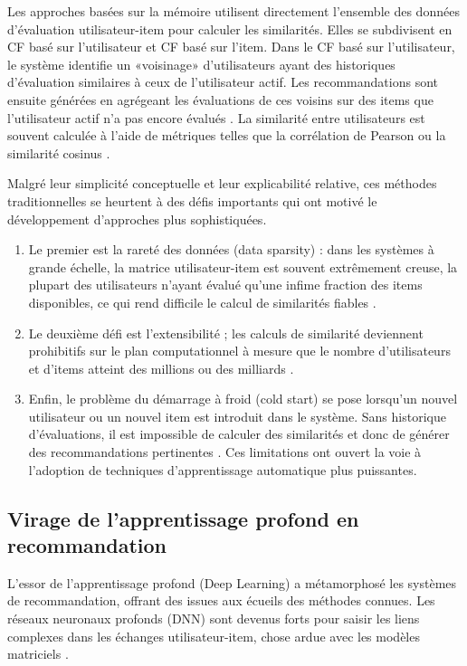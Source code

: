 Les approches basées sur la mémoire utilisent directement l'ensemble des données d'évaluation utilisateur-item pour calculer les similarités. Elles se subdivisent en CF basé sur l'utilisateur et CF basé sur l'item. Dans le CF basé sur l'utilisateur, le système identifie un «voisinage» d'utilisateurs ayant des historiques d'évaluation similaires à ceux de l'utilisateur actif. Les recommandations sont ensuite générées en agrégeant les évaluations de ces voisins sur des items que l'utilisateur actif n'a pas encore évalués \citet{Herlocker2004}. La similarité entre utilisateurs est souvent calculée à l'aide de métriques telles que la corrélation de Pearson ou la similarité cosinus \citet{Breese2002Empirical}.

Malgré leur simplicité conceptuelle et leur explicabilité relative, ces méthodes traditionnelles se heurtent à des défis importants qui ont motivé le développement d'approches plus sophistiquées. 
\begin{enumerate}
    \item Le premier est la rareté des données (data sparsity) : dans les systèmes à grande échelle, la matrice utilisateur-item est souvent extrêmement creuse, la plupart des utilisateurs n'ayant évalué qu'une infime fraction des items disponibles, ce qui rend difficile le calcul de similarités fiables \citep{Sarwar2001, Isinkaye2015Recommendation}.
    \item Le deuxième défi est l'extensibilité ; les calculs de similarité deviennent prohibitifs sur le plan computationnel à mesure que le nombre d'utilisateurs et d'items atteint des millions ou des milliards \citep{Linden2003Amazoncom}.
    \vspace{1em}
    \item Enfin, le problème du démarrage à froid (cold start) se pose lorsqu'un nouvel utilisateur ou un nouvel item est introduit dans le système. Sans historique d'évaluations, il est impossible de calculer des similarités et donc de générer des recommandations pertinentes \citep{Schein2002, Lika2014Facing}. Ces limitations ont ouvert la voie à l'adoption de techniques d'apprentissage automatique plus puissantes.
\end{enumerate}
\subsection{Virage de l'apprentissage profond en recommandation}

L'essor de l'apprentissage profond (Deep Learning) a métamorphosé les systèmes de recommandation, offrant des issues aux écueils des méthodes connues. Les réseaux neuronaux profonds (DNN) sont devenus forts pour saisir les liens complexes dans les échanges utilisateur-item, chose ardue avec les modèles matriciels \citep{He2017, Covington2016}. 

